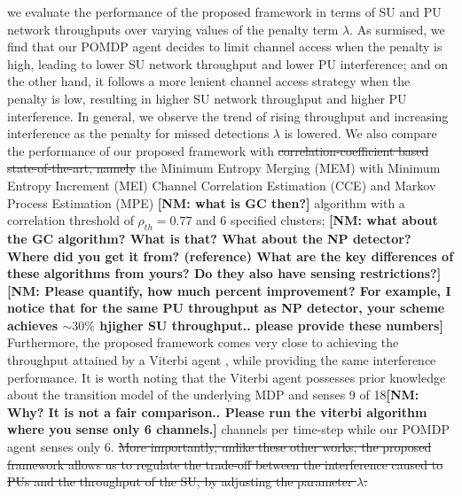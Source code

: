 \documentclass[10pt,twocolumn]{IEEEtran}
\newcommand{\sst}[1]{\st{#1}}
\newcommand{\nm}[1]{{\color{blue}\bf{[NM: #1]}}}
\newcommand{\add}[1]{{\color{red}{#1}}}
\begin{document}
\add{In Fig. \ref{fig:8},} we evaluate the performance of the proposed framework in terms of SU and PU network throughputs over varying values of the penalty term $\lambda$. As surmised, we find that our POMDP agent decides to limit channel access when the penalty is high, leading to lower SU network throughput and lower PU interference; and on the other hand, it follows a more lenient channel access strategy when the penalty is low, resulting in higher SU network throughput and higher PU interference. In general, we observe the trend of rising throughput and increasing interference as the penalty for missed detections $\lambda$ is lowered.
We also compare the performance of our proposed framework with
\add{state-of-the-art algorithms, namely:}
\sst{ correlation-coefficient based state-of-the-art, namely} the Minimum Entropy Merging (MEM) with Minimum Entropy Increment (MEI) Channel Correlation Estimation (CCE) and Markov Process Estimation (MPE)
\nm{what is GC then?} algorithm \add{\cite{6956794},} with a correlation threshold of $\rho_{th}{=}0.77$ and $6$ specified clusters;
\add{the Viterbi algorithm \cite{4554696};}
\nm{what about the GC algorithm? What is that? What about the NP detector? Where did you get it from? (reference) What are the key differences of these algorithms  from yours? Do they also have sensing restrictions?}
\add{We note that our proposed algorithm outperforms the state-of-the-art,
by achieving a higher SU throughput for a certain throughput degradation caused to the PUs. For instance.....}\nm{Please quantify, how much percent improvement? For example, I notice that for the same PU throughput as NP detector, your scheme achieves $\sim 30\%$ hjigher SU throughput.. please provide these numbers}
\add{In addition, unlike these other algorithms, our proposed framework allows the SU to regulate the trade-off between its throughput and the interference caused to PUs, by adjusting the parameter $\lambda$.
This is an important feature in practical scenarios, where different interference constraints may be imposed on incumbents.}
 Furthermore, the proposed framework comes very close to achieving the throughput attained by a Viterbi agent \cite{4554696}, while providing the same interference performance. It is worth noting that the Viterbi agent possesses prior knowledge about the transition model of the underlying MDP and senses 9 of 18\nm{Why? It is not a fair comparison.. Please run the viterbi algorithm where you sense only 6 channels.} channels per time-step while our POMDP agent senses only 6. \sst{More importantly, unlike these other works, the proposed framework allows us to regulate the trade-off between the interference caused to PUs and the throughput of the SU, by adjusting the parameter $\lambda$.}
\vspace{-4mm}
\end{document}
